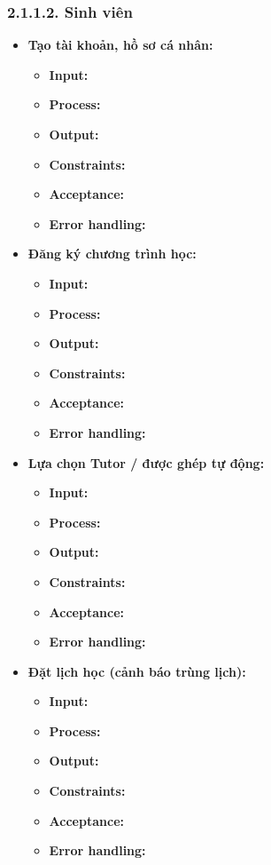 \subsubsection*{2.1.1.2. Sinh viên}
\begin{itemize}
    \item \textbf{Tạo tài khoản, hồ sơ cá nhân:}
    \begin{itemize}
        \item \textbf{Input:}
        \item \textbf{Process:}
        \item \textbf{Output:}
        \item \textbf{Constraints:}
        \item \textbf{Acceptance:}
        \item \textbf{Error handling:}
    \end{itemize}

    \item \textbf{Đăng ký chương trình học:}
    \begin{itemize}
        \item \textbf{Input:}
        \item \textbf{Process:}
        \item \textbf{Output:}
        \item \textbf{Constraints:}
        \item \textbf{Acceptance:}
        \item \textbf{Error handling:}
    \end{itemize}

    \item \textbf{Lựa chọn Tutor / được ghép tự động:}
    \begin{itemize}
        \item \textbf{Input:}
        \item \textbf{Process:}
        \item \textbf{Output:}
        \item \textbf{Constraints:}
        \item \textbf{Acceptance:}
        \item \textbf{Error handling:}
    \end{itemize}

    \item \textbf{Đặt lịch học (cảnh báo trùng lịch):}
    \begin{itemize}
        \item \textbf{Input:}
        \item \textbf{Process:}
        \item \textbf{Output:}
        \item \textbf{Constraints:}
        \item \textbf{Acceptance:}
        \item \textbf{Error handling:}
    \end{itemize}


\end{itemize}
